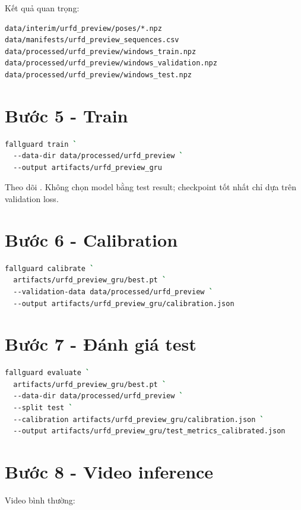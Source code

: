 \documentclass[12pt,a4paper,oneside]{report}
\newcommand{\pathcode}[1]{\texttt{\detokenize{#1}}}
\begin{document}
Kết quả quan trọng:

\begin{lstlisting}
data/interim/urfd_preview/poses/*.npz
data/manifests/urfd_preview_sequences.csv
data/processed/urfd_preview/windows_train.npz
data/processed/urfd_preview/windows_validation.npz
data/processed/urfd_preview/windows_test.npz
\end{lstlisting}

\section{Bước 5 - Train}

\begin{lstlisting}[language=bash]
fallguard train `
  --data-dir data/processed/urfd_preview `
  --output artifacts/urfd_preview_gru
\end{lstlisting}

Theo dõi \pathcode{history.csv}. Không chọn model bằng test result; checkpoint
tốt nhất chỉ dựa trên validation loss.

\section{Bước 6 - Calibration}

\begin{lstlisting}[language=bash]
fallguard calibrate `
  artifacts/urfd_preview_gru/best.pt `
  --validation-data data/processed/urfd_preview `
  --output artifacts/urfd_preview_gru/calibration.json
\end{lstlisting}

\section{Bước 7 - Đánh giá test}

\begin{lstlisting}[language=bash]
fallguard evaluate `
  artifacts/urfd_preview_gru/best.pt `
  --data-dir data/processed/urfd_preview `
  --split test `
  --calibration artifacts/urfd_preview_gru/calibration.json `
  --output artifacts/urfd_preview_gru/test_metrics_calibrated.json
\end{lstlisting}

\section{Bước 8 - Video inference}

Video bình thường:
\end{document}
